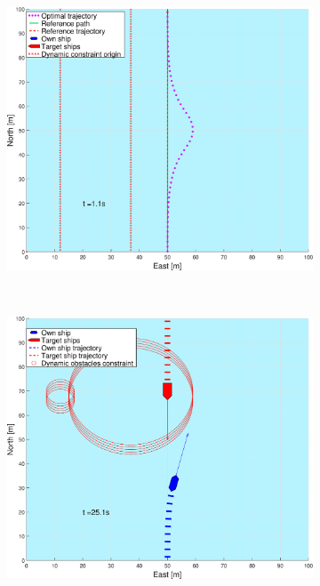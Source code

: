 \begin{figure}[ht!]
\begin{subfigure}[b]{0.49\textwidth}
        \subcaption{}
    \end{subfigure}
    \hfill
    \begin{subfigure}[b]{0.499\textwidth}
        \centering
        \includegraphics[width=\textwidth]{Images/Figures/enkel_HO/_Simple_0fig999_time=1}
        \subcaption{}
    \end{subfigure}
    \hfill
    \\
    \begin{subfigure}[b]{0.49\textwidth}
        \centering
        \includegraphics[width=\textwidth]{Images/Figures/enkel_HO/_Simple_0fig1_time=25}

\end{subfigure}
\end{figure}
